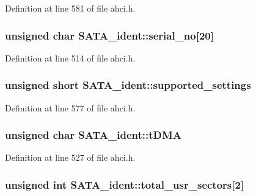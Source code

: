 Definition at line 581 of file ahci.\+h.

\subsubsection[{\texorpdfstring{serial\+\_\+no}{serial_no}}]{\setlength{\rightskip}{0pt plus 5cm}unsigned char S\+A\+T\+A\+\_\+ident\+::serial\+\_\+no\mbox{[}20\mbox{]}}\hypertarget{structSATA__ident_ab3928623c2c1f05d7dd0635aef68adf7}{}\label{structSATA__ident_ab3928623c2c1f05d7dd0635aef68adf7}


Definition at line 514 of file ahci.\+h.

\subsubsection[{\texorpdfstring{supported\+\_\+settings}{supported_settings}}]{\setlength{\rightskip}{0pt plus 5cm}unsigned short S\+A\+T\+A\+\_\+ident\+::supported\+\_\+settings}\hypertarget{structSATA__ident_ae8dec1fde7e95fc8810c1fc1a3849eff}{}\label{structSATA__ident_ae8dec1fde7e95fc8810c1fc1a3849eff}


Definition at line 577 of file ahci.\+h.

\subsubsection[{\texorpdfstring{t\+D\+MA}{tDMA}}]{\setlength{\rightskip}{0pt plus 5cm}unsigned char S\+A\+T\+A\+\_\+ident\+::t\+D\+MA}\hypertarget{structSATA__ident_af4ac3e7711b35ed8bc6989d23d914b36}{}\label{structSATA__ident_af4ac3e7711b35ed8bc6989d23d914b36}


Definition at line 527 of file ahci.\+h.

\subsubsection[{\texorpdfstring{total\+\_\+usr\+\_\+sectors}{total_usr_sectors}}]{\setlength{\rightskip}{0pt plus 5cm}unsigned int S\+A\+T\+A\+\_\+ident\+::total\+\_\+usr\+\_\+sectors\mbox{[}2\mbox{]}}\hypertarget{structSATA__ident_a37e147644b63060f56f12605f8578441}{}\label{structSATA__ident_a37e147644b63060f56f12605f8578441}


